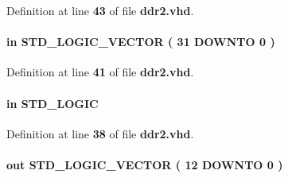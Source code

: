 Definition at line {\bf 43} of file {\bf ddr2.\+vhd}.

\paragraph[{local\+\_\+wdata}]{ {\bfseries \textcolor{keywordflow}{in}\textcolor{vhdlchar}{ }} {\bfseries \textcolor{comment}{S\+T\+D\+\_\+\+L\+O\+G\+I\+C\+\_\+\+V\+E\+C\+T\+OR}\textcolor{vhdlchar}{ }\textcolor{vhdlchar}{(}\textcolor{vhdlchar}{ }\textcolor{vhdlchar}{ } \textcolor{vhdldigit}{31} \textcolor{vhdlchar}{ }\textcolor{keywordflow}{D\+O\+W\+N\+TO}\textcolor{vhdlchar}{ }\textcolor{vhdlchar}{ } \textcolor{vhdldigit}{0} \textcolor{vhdlchar}{ }\textcolor{vhdlchar}{)}\textcolor{vhdlchar}{ }} \hspace{0.3cm}{\ttfamily [Port]}}\label{classddr2_ae1f9cd7e35eafdedc6a3ecb19f054076}


Definition at line {\bf 41} of file {\bf ddr2.\+vhd}.

\paragraph[{local\+\_\+write\+\_\+req}]{ {\bfseries \textcolor{keywordflow}{in}\textcolor{vhdlchar}{ }} {\bfseries \textcolor{comment}{S\+T\+D\+\_\+\+L\+O\+G\+IC}\textcolor{vhdlchar}{ }} \hspace{0.3cm}{\ttfamily [Port]}}\label{classddr2_a4ecfa9a9a7b188925e020dec779e26a4}


Definition at line {\bf 38} of file {\bf ddr2.\+vhd}.

\paragraph[{mem\+\_\+addr}]{ {\bfseries \textcolor{keywordflow}{out}\textcolor{vhdlchar}{ }} {\bfseries \textcolor{comment}{S\+T\+D\+\_\+\+L\+O\+G\+I\+C\+\_\+\+V\+E\+C\+T\+OR}\textcolor{vhdlchar}{ }\textcolor{vhdlchar}{(}\textcolor{vhdlchar}{ }\textcolor{vhdlchar}{ } \textcolor{vhdldigit}{12} \textcolor{vhdlchar}{ }\textcolor{keywordflow}{D\+O\+W\+N\+TO}\textcolor{vhdlchar}{ }\textcolor{vhdlchar}{ } \textcolor{vhdldigit}{0} \textcolor{vhdlchar}{ }\textcolor{vhdlchar}{)}\textcolor{vhdlchar}{ }} \hspace{0.3cm}{\ttfamily [Port]}}\label{classddr2_a6ebd63d6ab445edbfddde13873c36097}



